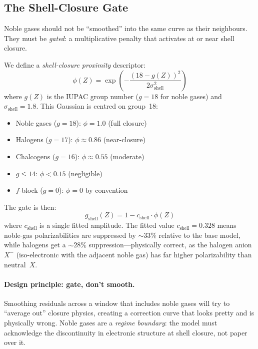 \documentclass[11pt,letterpaper]{article}
\begin{document}
\subsection{The Shell-Closure Gate}

Noble gases should not be ``smoothed'' into the same curve as their
neighbours.  They must be \emph{gated}: a multiplicative penalty that
activates at or near shell closure.

We define a \emph{shell-closure proximity} descriptor:
\begin{equation}
\phi(Z) = \exp\!\left(-\frac{(18 - g(Z))^2}{2\sigma_{\text{shell}}^2}\right)
\label{eq:phi}
\end{equation}
where $g(Z)$ is the IUPAC group number ($g = 18$ for noble gases) and
$\sigma_{\text{shell}} = 1.8$.  This Gaussian is centred on group~18:
\begin{itemize}
  \item Noble gases ($g = 18$): $\phi = 1.0$ (full closure)
  \item Halogens ($g = 17$): $\phi \approx 0.86$ (near-closure)
  \item Chalcogens ($g = 16$): $\phi \approx 0.55$ (moderate)
  \item $g \leq 14$: $\phi < 0.15$ (negligible)
  \item $f$-block ($g = 0$): $\phi = 0$ by convention
\end{itemize}

The gate is then:
\begin{equation}
g_{\text{shell}}(Z) = 1 - c_{\text{shell}} \cdot \phi(Z)
\label{eq:gshell}
\end{equation}
where $c_{\text{shell}}$ is a single fitted amplitude.  The fitted
value $c_{\text{shell}} = 0.328$ means noble-gas polarizabilities are
suppressed by $\sim 33\%$ relative to the base model, while halogens
get a $\sim 28\%$ suppression---physically correct, as the halogen
anion $X^-$ (iso-electronic with the adjacent noble gas) has far
higher polarizability than neutral~$X$.

\paragraph{Design principle: gate, don't smooth.}
Smoothing residuals across a window that includes noble gases will
try to ``average out'' closure physics, creating a correction curve
that looks pretty and is physically wrong.  Noble gases are a
\emph{regime boundary}: the model must acknowledge the discontinuity
in electronic structure at shell closure, not paper over it.
\end{document}
